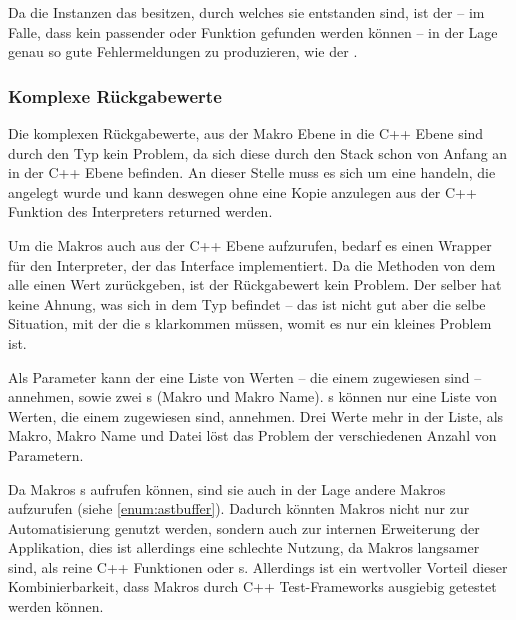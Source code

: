       Da die  Instanzen das  besitzen, durch welches sie entstanden sind, ist der  -- im Falle, dass kein passender  oder Funktion gefunden werden können -- in der Lage genau so gute Fehlermeldungen zu produzieren, wie der .


    \subsubsection{Komplexe Rückgabewerte}
    \label{sssec:Komplexe Rückgabewerte}
      Die komplexen Rückgabewerte, aus der Makro Ebene in die C++ Ebene sind durch den  Typ kein Problem, da sich diese durch den Stack schon von Anfang an in der C++ Ebene befinden. An dieser Stelle muss es sich um eine  handeln, die angelegt wurde und kann deswegen ohne eine Kopie anzulegen aus der C++ Funktion des Interpreters returned werden.

      Um die Makros auch aus der C++ Ebene aufzurufen, bedarf es einen Wrapper für den Interpreter, der das  Interface implementiert. Da die  Methoden von dem  alle einen  Wert zurückgeben, ist der Rückgabewert kein Problem. Der  selber hat keine Ahnung, was sich in dem  Typ befindet -- das ist nicht gut aber die selbe Situation, mit der die s klarkommen müssen, womit es nur ein kleines Problem ist.

      Als Parameter kann der  eine Liste von  Werten -- die einem  zugewiesen sind -- annehmen, sowie zwei s (Makro und Makro Name). s können nur eine Liste von  Werten, die einem  zugewiesen sind, annehmen. Drei  Werte mehr in der Liste, als Makro, Makro Name und Datei löst das Problem der verschiedenen Anzahl von Parametern.

      Da Makros s aufrufen können, sind sie auch in der Lage andere Makros aufzurufen (siehe \autoref{enum:astbuffer}). Dadurch könnten Makros nicht nur zur Automatisierung genutzt werden, sondern auch zur internen Erweiterung der Applikation, dies ist allerdings eine schlechte Nutzung, da Makros langsamer sind, als reine C++ Funktionen oder s. Allerdings ist ein wertvoller Vorteil dieser Kombinierbarkeit, dass Makros durch C++ Test-Frameworks ausgiebig getestet werden können.

